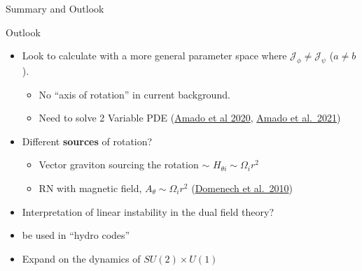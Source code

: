 \documentclass[xcolor=dvipsnames]{beamer}
\begin{document}
\begin{frame}{Summary and Outlook}

  \begin{block}{Outlook}
    \begin{itemize}
      \item
        Look to calculate with a more general parameter space where
        \(\mathcal J_\phi\neq\mathcal J_\psi\) (\(a\neq b\)).

        \begin{itemize}
          \item
            No ``axis of rotation'' in current background.
          \item
            Need to solve 2 Variable PDE (\href{https://inspirehep.net/literature/1780844}{Amado et
            al 2020}, \href{https://inspirehep.net/literature/1844790}{Amado et
            al.~2021})
        \end{itemize}
      \item
        Different \textbf{sources} of rotation?

        \begin{itemize}
          \item
            Vector graviton sourcing the rotation $\sim$ 
            \(H_{\theta i} \sim \Omega_i r^2\)
          \item
            RN with magnetic field, \(A_\theta \sim \Omega_i r^2\)
            (\href{https://inspirehep.net/literature/854786}{Domenech et al.~2010})
        \end{itemize}
      \item
        Interpretation of linear instability in the dual field theory?
      \item
        be used in ``hydro codes''
      \item
        Expand on the dynamics of $SU(2)\times U(1)$
    \end{itemize}
  \end{block}

\end{frame}
\end{document}
